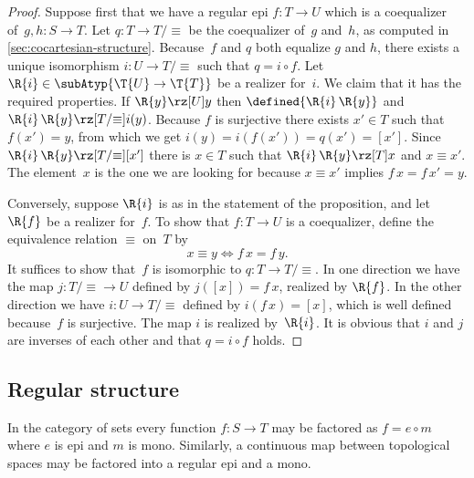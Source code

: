\begin{proof}
  Suppose first that we have a regular epi $f : T \to U$
  which is a coequalizer of~$g, h : S \to T$. Let $q :
  T \to T/{\equiv}$ be the coequalizer of~$g$ and~$h$, as
  computed in \cref{sec:cocartesian-structure}. Because~$f$ and
  $q$ both equalize $g$ and $h$, there exists a unique isomorphism $i
  : U \to T/{\equiv}$ such that $q = i \circ f$. Let
  $\R{i} \in \subAtyp{\T{U} \to \T{T}}$ be a realizer for~$i$. We claim
  that it has the required properties. If $\R{y} \rz[U] y$ then
  $\defined{\R{i}\,\R{y}}$ and $\R{i}\,\R{y} \rz[T/{\equiv}] i(y)$.
  Because $f$ is surjective there exists $x' \in T$ such that $f(x') =
  y$, from which we get $i(y) = i(f(x')) = q(x') = [x']$. Since
  $\R{i}\,\R{y} \rz[T/{\equiv}] [x']$ there is $x \in T$ such that
  $\R{i}\,\R{y} \rz[T] x$ and $x \equiv x'$. The element~$x$ is the one
  we are looking for because $x \equiv x'$ implies $f\,x = f\,x' = y$.

  Conversely, suppose $\R{i}$ is as in the statement of the
  proposition, and let $\R{f}$ be a realizer for~$f$. To show that $f
  : T \to U$ is a coequalizer, define the equivalence
  relation $\equiv$ on~$T$ by
  \begin{equation*}
    x \equiv y \iff f\,x = f\,y.
  \end{equation*}
  It suffices to show that~$f$ is isomorphic to $q : T \to
  T/{\equiv}$. In one direction we have the map $j : T/{\equiv}
  \to U$ defined by $j([x]) = f\,x$, realized by $\R{f}$. In the other
  direction we have $i : U \to T/{\equiv}$ defined by $i(f\,x) = [x]$,
  which is well defined because~$f$ is surjective. The map $i$ is
  realized by~$\R{i}$. It is obvious that $i$ and $j$ are inverses of
  each other and that $q = i \circ f$ holds.
\end{proof}

\subsection{Regular structure}
\label{sec:regular-structure}

In the category of sets every function $f : S \to T$ may be factored
as $f = e \circ m$ where $e$ is epi and $m$ is mono. Similarly, a
continuous map between topological spaces may be factored into a
regular epi and a mono.

